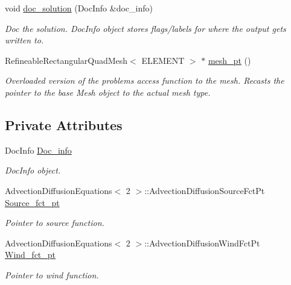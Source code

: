 \begin{DoxyCompactItemize}
void \hyperlink{classRefineableAdvectionDiffusionProblem_a50af5d1ac7092f299967c962b15c5a0c}{doc\+\_\+solution} (Doc\+Info \&doc\+\_\+info)
\begin{DoxyCompactList}\small\item\em Doc the solution. Doc\+Info object stores flags/labels for where the output gets written to. \end{DoxyCompactList}\item 
Refineable\+Rectangular\+Quad\+Mesh$<$ E\+L\+E\+M\+E\+NT $>$ $\ast$ \hyperlink{classRefineableAdvectionDiffusionProblem_abe616b5b3d3e4d3c0d3be777e3b3ac34}{mesh\+\_\+pt} ()
\begin{DoxyCompactList}\small\item\em Overloaded version of the problem\textquotesingle{}s access function to the mesh. Recasts the pointer to the base Mesh object to the actual mesh type. \end{DoxyCompactList}\end{DoxyCompactItemize}
\subsection*{Private Attributes}
\begin{DoxyCompactItemize}
\item 
Doc\+Info \hyperlink{classRefineableAdvectionDiffusionProblem_a42bd65f40095a70a103ee900e7614b19}{Doc\+\_\+info}
\begin{DoxyCompactList}\small\item\em Doc\+Info object. \end{DoxyCompactList}\item 
Advection\+Diffusion\+Equations$<$ 2 $>$\+::Advection\+Diffusion\+Source\+Fct\+Pt \hyperlink{classRefineableAdvectionDiffusionProblem_a8fa313562d365965e24282c2e11a8ec6}{Source\+\_\+fct\+\_\+pt}
\begin{DoxyCompactList}\small\item\em Pointer to source function. \end{DoxyCompactList}\item 
Advection\+Diffusion\+Equations$<$ 2 $>$\+::Advection\+Diffusion\+Wind\+Fct\+Pt \hyperlink{classRefineableAdvectionDiffusionProblem_ab52483c93bacbb9521aaaf52680be996}{Wind\+\_\+fct\+\_\+pt}
\begin{DoxyCompactList}\small\item\em Pointer to wind function. \end{DoxyCompactList}\end{DoxyCompactItemize}


